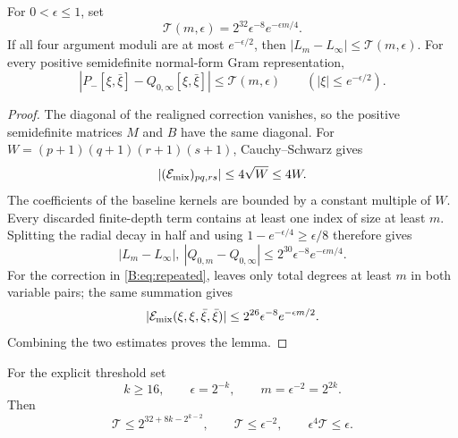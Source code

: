 \begin{lemma}\label{B:lem:quant-tails}
For $0<\epsilon\le1$, set
\begin{equation}\label{B:eq:tail-budget}
 \mathcal T(m,\epsilon)=2^{32}\epsilon^{-8}e^{-\epsilon m/4}.
\end{equation}
If all four argument moduli are at most $e^{-\epsilon/2}$, then
$|L_m-L_\infty|\le\mathcal T(m,\epsilon)$.  For every positive
semidefinite normal-form Gram representation,
\begin{equation}\label{B:eq:conjugate-tail}
 |P_-[\xi,\bar\xi]-Q_{0,\infty}[\xi,\bar\xi]|
 \le\mathcal T(m,\epsilon)
 \qquad(|\xi|\le e^{-\epsilon/2}).
\end{equation}
\end{lemma}

\begin{proof}
The diagonal of the realigned correction vanishes, so the positive
semidefinite matrices $M$ and $B$ have the same diagonal.  For
$W=(p+1)(q+1)(r+1)(s+1)$, Cauchy--Schwarz gives
\[
 |(\mathcal E_{\rm mix})_{pq,rs}|\le4\sqrt W\le4W.
\]
The coefficients of the baseline kernels are bounded by a constant
multiple of $W$.  Every discarded finite-depth term contains at least one
index of size at least $m$.  Splitting the radial decay in half and using
$1-e^{-\epsilon/4}\ge\epsilon/8$ therefore gives
\[
 |L_m-L_\infty|,\ |Q_{0,m}-Q_{0,\infty}|
 \le2^{30}\epsilon^{-8}e^{-\epsilon m/4}.
\]
For the correction in \eqref{B:eq:repeated},  leaves
only total degrees at least $m$ in both variable pairs; the same summation
gives
\[
 |\mathcal E_{\rm mix}(\xi,\xi,\bar\xi,\bar\xi)|
 \le2^{26}\epsilon^{-8}e^{-\epsilon m/2}.
\]
Combining the two estimates proves the lemma.
\end{proof}

For the explicit threshold set
\begin{equation}\label{B:eq:dyadic-scale}
 k\ge16,\qquad \epsilon=2^{-k},\qquad m=\epsilon^{-2}=2^{2k}.
\end{equation}
Then
\begin{equation}\label{B:eq:dyadic-tails}
 \mathcal T\le2^{32+8k-2^{k-2}},\qquad
 \mathcal T\le\epsilon^{-2},\qquad
 \epsilon^4\mathcal T\le\epsilon.
\end{equation}


